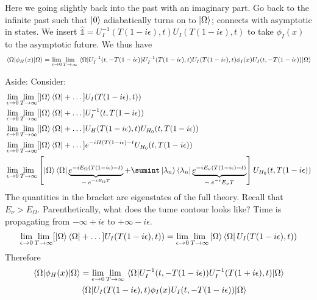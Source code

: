 Here we going slightly back into the past with an imaginary part. Go back to the infinite past such that $\ket{0}$ adiabatically turns on to $\ket{\Omega}$; connects with asymptotic in states. We insert $\hat{\mathds{1}} = U_{I}^{-1} (T (1-  i\epsilon) , t)  U_{I}( T(1 - i\epsilon) , t)$ to take $\phi_I (x)$ to the asymptotic future. We thus have
\begin{align}
    \mel{\Omega}{\phi_H (x)}{\Omega} = \lim_{\epsilon \to 0} \lim_{T \to \infty}  \mel{\Omega}{  U_{I}^{-1} (t, -T (1-i\epsilon))  U_{I}^{-1} ( T(1 - i\epsilon) , t) U_I (T(1 - i\epsilon) , t) \phi_I (x) U_I (t, -T (1 - i\epsilon))  }{\Omega}
\end{align}

Aside: Consider: 
\begin{align}
    & \lim_{\epsilon \to 0 } \lim_{T \to \infty} [ \ket{\Omega} \bra{\Omega} + \dots ] U_I (T (1 - i\epsilon) , t)) \nonumber\\
    & \lim_{\epsilon \to 0 } \lim_{T \to \infty} [ \ket{\Omega} \bra{\Omega} + \dots ] U_{I}^{-1} (t, T(1 - i\epsilon)) \nonumber\\
    & \lim_{\epsilon \to 0 } \lim_{T \to \infty} [ \ket{\Omega} \bra{\Omega} + \dots ] U_{H} ( T(1 - i\epsilon), t) U_{H_0} (t, T(1 - i\epsilon))  \nonumber\\
        & \lim_{\epsilon \to 0 } \lim_{T \to \infty} [ \ket{\Omega} \bra{\Omega} + \dots ] e^{-iH (T(1-i\epsilon) - t}U_{H_0} (t, T(1 - i\epsilon)) \nonumber\\
        &  \lim_{\epsilon \to 0 } \lim_{T \to \infty}\left[  \ket{\Omega} \bra{\Omega} \underbrace{e^{-iE_{\Omega} 
(T (1-i\epsilon) - t) }}_\text{$\sim e^{-\epsilon E_{\Omega} T}$} + \sumint \ket{\lambda_n} \bra{\lambda_n} \underbrace{e^{-iE_\nu (T (1-i\epsilon) - t)  }}_\text{$\sim e^{-\epsilon} E_\nu T$}  \right]U_{H_0} (t, T(1 - i\epsilon)) \nonumber\\
\end{align}
The quantities in the bracket are eigenstates of the full theory. Recall that $E_\nu > E_{\Omega}$. Parenthetically, what does the tume contour looks like? Time is propagating from $-\infty + i\epsilon$ to $+ \infty -i\epsilon$. 
\begin{align}
    \lim_{\epsilon \to 0 } \lim_{T \to \infty}  [ \ket{\Omega} \bra{\Omega} + \dots  ] U_I (T (1 - i\epsilon) , t)) =  \lim_{\epsilon \to 0 } \lim_{T \to \infty} \ket{\Omega} \bra{\Omega}  U_I (T (1 - i\epsilon) , t))
\end{align}
Therefore
\begin{align}
    \mel{\Omega}{ \phi_H (x) }{\Omega} & = \lim_{\epsilon \to 0 } \lim_{T \to \infty} \mel{\Omega}{ U_{I}^{-1} (t, -T(1 - i\epsilon)) U_{I}^{-1} ( T(1 + i\epsilon)  , t )  }{\Omega} \nonumber\\ & \mel{\Omega}{ U_{I} ( T(1 - i\epsilon) , t) \phi_I (x) U_{I} ( t, -T(1 - i\epsilon) )  }{\Omega} 
\end{align}
